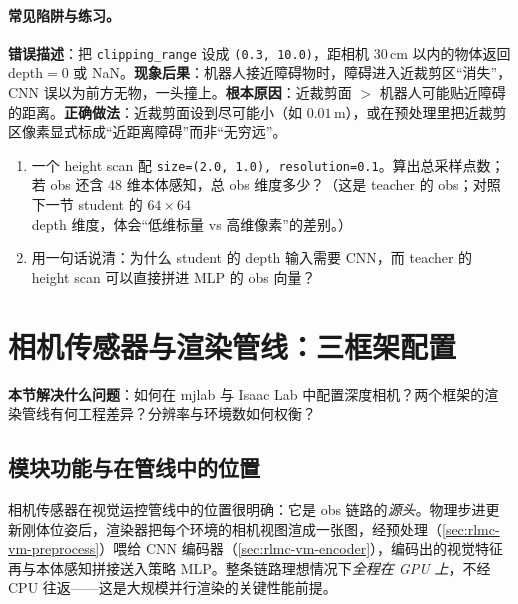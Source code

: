\paragraph{常见陷阱与练习。}

\begin{pitfall}
\textbf{错误描述}：把 \verb|clipping_range| 设成 \verb|(0.3, 10.0)|，距相机 30\,cm 以内的物体返回 depth$=0$ 或 NaN。\textbf{现象后果}：机器人接近障碍物时，障碍进入近裁剪区“消失”，CNN 误以为前方无物，一头撞上。\textbf{根本原因}：近裁剪面 $>$ 机器人可能贴近障碍的距离。\textbf{正确做法}：近裁剪面设到尽可能小（如 $0.01$\,m），或在预处理里把近裁剪区像素显式标成“近距离障碍”而非“无穷远”。
\end{pitfall}

\begin{practice}[范式落差的换算]
\begin{enumerate}
\item 一个 height scan 配 \verb|size=(2.0, 1.0), resolution=0.1|。算出总采样点数；若 obs 还含 48 维本体感知，总 obs 维度多少？（这是 teacher 的 obs；对照下一节 student 的 $64\times64$ depth 维度，体会“低维标量 vs 高维像素”的差别。）
\item 用一句话说清：为什么 student 的 depth 输入需要 CNN，而 teacher 的 height scan 可以直接拼进 MLP 的 obs 向量？
\end{enumerate}
\end{practice}

\section{相机传感器与渲染管线：三框架配置}
\label{sec:rlmc-vm-camera}

\textbf{本节解决什么问题}：如何在 mjlab 与 Isaac Lab 中配置深度相机？两个框架的渲染管线有何工程差异？分辨率与环境数如何权衡？

\subsection{模块功能与在管线中的位置}
\label{sec:rlmc-vm-camera-role}

相机传感器在视觉运控管线中的位置很明确：它是 obs 链路的\emph{源头}。物理步进更新刚体位姿后，渲染器把每个环境的相机视图渲成一张图，经预处理（\cref{sec:rlmc-vm-preprocess}）喂给 CNN 编码器（\cref{sec:rlmc-vm-encoder}），编码出的视觉特征再与本体感知拼接送入策略 MLP。整条链路理想情况下\emph{全程在 GPU 上}，不经 CPU 往返——这是大规模并行渲染的关键性能前提。

